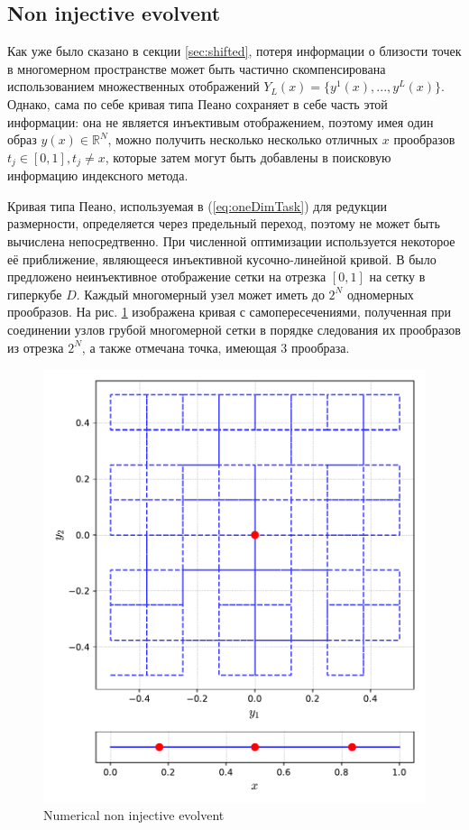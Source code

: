 \documentclass[runningheads]{llncs}
\begin{document}
\subsection{Non injective evolvent}

Как уже было сказано в секции \ref{sec:shifted}, потеря информации о близости точек в многомерном пространстве может быть частично скомпенсирована использованием множественных отображений $Y_L(x)=\{y^1(x),...,y^L(x)\}$. Однако, сама по себе кривая типа Пеано сохраняет в себе часть этой информации: она не является инъективым отображением, поэтому имея один образ $y(x)\in \mathbb{R}^N$, можно получить несколько несколько отличных $x$ прообразов $t_j\in[0,1], t_j \not = x$, которые затем могут быть добавлены в поисковую информацию индексного метода.

Кривая типа Пеано, используемая в (\ref{eq:oneDimTask}) для редукции размерности, определяется через предельный переход,
поэтому не может быть вычислена непосредтвенно. При численной оптимизации используется некоторое её приближение, являющееся
инъективной кусочно-линейной кривой. В \cite{strongin1978} было предложено неинъективное отображение сетки на отрезка $[0,1]$ на сетку в гиперкубе $D$. Каждый многомерный узел может иметь до $2^N$ одномерных прообразов. На рис. \ref{fig:noninjective} изображена кривая с самопересечениями, полученная при соединении узлов грубой многомерной сетки в порядке следования их прообразов из отрезка $2^N$, а также отмечана точка, имеющая 3 прообраза.

\begin{figure}[t]
  \centering
  \includegraphics[width=0.6\linewidth]{pictures/noninjective.pdf}
  \caption{Numerical non injective evolvent}
  \label{fig:noninjective}
\end{figure}
\end{document}

